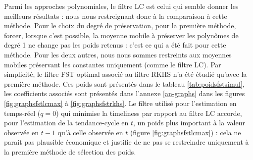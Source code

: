 \documentclass[
  11pt,
  french,
  a4paper]{article}
\newcommand\1{\mathds{1}}
\begin{document}
Parmi les approches polynomiales, le filtre LC est celui qui semble donner les meilleurs résultats : nous nous restreignant donc à la comparaison à cette méthode.
Pour le choix du degré de préservation, pour la première méthode, forcer, lorsque c'est possible, la moyenne mobile à préserver les polynômes de degré 1 ne change pas les poids retenus : c'est ce qui a été fait pour cette méthode. Pour les deux autres, nous nous sommes restreints aux moyennes mobiles préservant les constantes uniquement (comme le filtre LC).
Par simplicité, le filtre FST optimal associé au filtre RKHS n'a été étudié qu'avec la première méthode.
Ces poids sont présentés dans le tableau \ref{tab:poidsfstsimul}, les coefficients associés sont présentés dans l'annexe \ref{an-graphs} dans les figures \ref{fig:graphsfstlcmax} à \ref{fig:graphsfstrkhs}.
Le filtre utilisé pour l'estimation en temps-réel (\(q=0\)) qui minimise la timeliness par rapport au filtre LC accorde, pour l'estimation de la tendance-cycle en \(t\), un poids plus important à la valeur observée en \(t-1\) qu'à celle observée en \(t\) (figure \ref{fig:graphsfstlcmax}) : cela ne parait pas plausible économique et justifie de ne pas se restreindre uniquement à la première méthode de sélection des poids.
\end{document}
